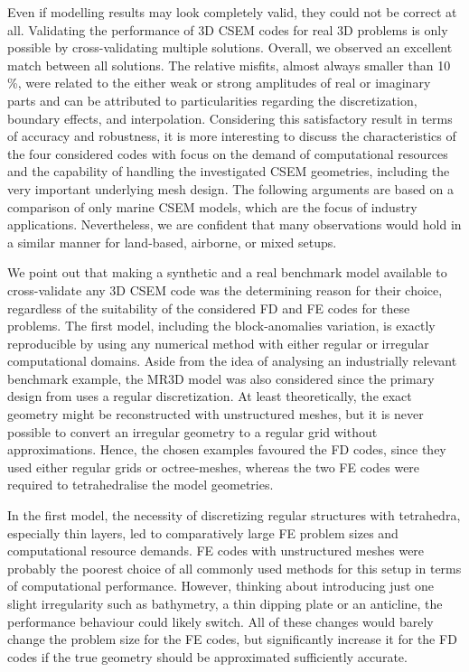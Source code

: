 \documentclass[
    paper,
  ]{geophysics}
\begin{document}
Even if modelling results may look completely valid, they could not be correct at all. Validating the performance of 3D CSEM codes for real 3D problems is only possible by cross-validating multiple solutions. Overall, we observed an excellent match between all solutions. The relative misfits, almost always smaller than 10\,\%, were related to the either weak or strong amplitudes of real or imaginary parts and can be attributed to particularities regarding the discretization, boundary effects, and interpolation. Considering this satisfactory result in terms of accuracy and robustness, it is more interesting to discuss the characteristics of the four considered codes with focus on the demand of computational resources and the capability of handling the investigated CSEM geometries, including the very important underlying mesh design. The following arguments are based on a comparison of only marine CSEM models, which are the focus of industry applications. Nevertheless, we are confident that many observations would hold in a similar manner for land-based, airborne, or mixed setups.

We point out that making a synthetic and a real benchmark model available to cross-validate any 3D CSEM code was the determining reason for their choice, regardless of the suitability of the considered FD and FE codes for these problems. The first model, including the block-anomalies variation, is exactly reproducible by using any numerical method with either regular or irregular computational domains. Aside from the idea of analysing an industrially relevant benchmark example, the MR3D model was also considered since the primary design from \cite{GEO.19.Correa} uses a regular discretization. At least theoretically, the exact geometry might be reconstructed with unstructured meshes, but it is never possible to convert an irregular geometry to a regular grid without approximations. Hence, the chosen examples favoured the FD codes, since they used either regular grids or octree-meshes, whereas the two FE codes were required to tetrahedralise the model geometries.

In the first model, the necessity of discretizing regular structures with tetrahedra, especially thin layers, led to comparatively large FE problem sizes and computational resource demands. FE codes with unstructured meshes were probably the poorest choice of all commonly used methods for this setup in terms of computational performance. However, thinking about introducing just one slight irregularity such as bathymetry, a thin dipping plate or an anticline, the performance behaviour could likely switch. All of these changes would barely change the problem size for the FE codes, but significantly increase it for the FD codes if the true geometry should be approximated sufficiently accurate.
\end{document}
